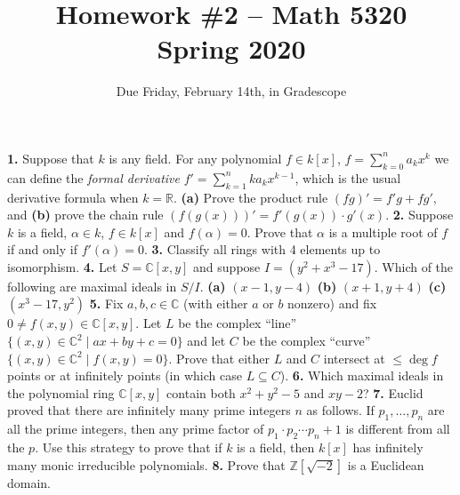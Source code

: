 \documentclass[10pt]{amsart}
\theoremstyle{theorem}
\newcommand{\bR}{{\mathbb{R}}}
\newcommand{\bZ}{\mathbb{Z}}
\newcommand{\bC}{\mathbb{C}}
\begin{document}
\title{Homework \#2 -- Math 5320\\Spring 2020}
\author{Due Friday, February 14th, in Gradescope}

\maketitle


\noindent
{\bf 1.}  Suppose that $k$ is any field.  For any polynomial $f \in k[x]$, $f = \sum_{k =0}^n a_k x^k$ we can define the \emph{formal derivative} $f' = \sum_{k = 1}^n k a_k x^{k-1}$, which is the usual derivative formula when $k = \bR$.  
\vskip 3pt
{\bf (a)}  Prove the product rule $(fg)' = f'g + fg'$, and 
\vskip 9pt
{\bf (b)}  prove the chain rule $(f(g(x)))' = f'(g(x)) \cdot g'(x)$.
\newpage
\noindent
{\bf 2.}  Suppose $k$ is a field, $\alpha \in k$, $f \in k[x]$ and $f(\alpha) = 0$.  Prove that $\alpha$ is a multiple root of $f$ if and only if $f'(\alpha) = 0$.  
\newpage
\noindent
{\bf 3.}  Classify all rings with 4 elements up to isomorphism.
\newpage
\noindent
{\bf 4.}  Let $S = \bC[x,y]$ and suppose $I = (y^2 + x^3 - 17)$.  Which of the following are maximal ideals in $S/I$.
\vskip 3pt
{\bf (a)}  $(x-1,y-4)$
\vskip 3pt
{\bf (b)}  $(x+1, y+4)$
\vskip 3pt
{\bf (c)}  $(x^3 - 17, y^2)$
\newpage
\noindent
{\bf 5.}  Fix $a,b, c \in \bC$ (with either $a$ or $b$ nonzero) and fix $0 \neq f(x,y) \in \bC[x,y]$.  Let $L$ be the complex ``line'' $\{(x,y) \in \bC^2 \;|\; ax + by + c = 0\}$ and let $C$ be the complex ``curve'' $\{(x,y) \in \bC^2 \;|\; f(x,y) = 0\}$.  Prove that either $L$ and $C$ intersect at $\leq \deg f$ points or at infinitely points (in which case $L \subseteq C$).
\newpage
\noindent
{\bf 6.}  Which maximal ideals in the polynomial ring $\bC[x,y]$ contain both $x^2 + y^2 -5$ and $xy - 2$?
\newpage
\noindent
{\bf 7.}  Euclid proved that there are infinitely many prime integers $n$ as follows.  If $p_1, \dots, p_n$ are all the prime integers, then any prime factor of $p_1 \cdot p_2 \cdots p_n + 1$ is different from all the $p$.  Use this strategy to prove that if $k$ is a field, then $k[x]$ has infinitely many monic irreducible polynomials.
\newpage
\noindent
{\bf 8.}  Prove that $\bZ[\sqrt{-2}]$ is a Euclidean domain. 
\end{document}

